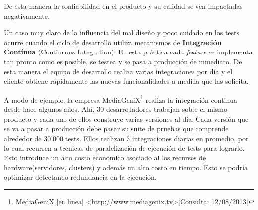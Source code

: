 \par De esta manera la confiabilidad en el producto y su calidad se ven impactadas negativamente. 

\par Un caso muy claro de la influencia del mal diseño y poco cuidado en los tests ocurre cuando el ciclo de desarrollo utiliza mecanismos de \textbf{Integración Contínua} (Continuous Integration). En esta práctica cada \emph{feature} se implementa tan pronto como es posible, se testea y se pasa a producción de inmediato. De esta manera el equipo de desarrollo realiza varias integraciones por día y el cliente obtiene rápidamente las nuevas funcionalidades a medida que las solicita. \\

\par A modo de ejemplo, la empresa MediaGeniX\footnote{MediaGeniX [en línea] \textless\url{http://www.mediagenix.tv}\textgreater [Consulta: 12/08/2013]} realiza la integración continua desde hace algunos años. Ahí, 30 desarrolladores trabajan sobre el mismo producto y cada uno de ellos construye varias versiones al día. Cada versión que se va a pasar a producción debe pasar su suite de pruebas que comprende alrededor de 30.000 tests. Ellos realizan 3 integraciones diarias en promedio, por lo cual recurren a técnicas de paralelización de ejecución de tests para lograrlo. Esto introduce un alto costo económico asociado al los recursos de hardware(servidores, clusters) y además un alto costo en tiempo. Esto se podría optimizar detectando redundancia en la ejecución. \\

